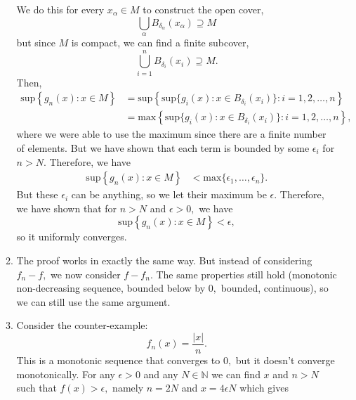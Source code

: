 \documentclass{article}
\numberwithin{equation}{section}
\begin{document}
\begin{enumerate}
\begin{enumerate}[label=(\alph*)]
        We do this for every $x_\alpha \in M$ to construct the open cover,
        \begin{equation}
            \bigcup_\alpha B_{\delta_{\alpha}}(x_\alpha) \supseteq M
        \end{equation}
        but since $M$ is compact, we can find a finite subcover,
        \begin{equation}
            \bigcup_{i=1}^n B_{\delta_i}(x_i) \supseteq M.
        \end{equation}
        Then,
        \begin{align}
            \text{sup}\left\{
                g_n(x):x\in M
            \right\} &=\text{sup}\left\{
                \text{sup}\{g_i(x):x\in B_{\delta_i}(x_i)\}:i=1,2,\dots,n
            \right\} \\ 
            &= \text{max}\left\{
                \text{sup}\{g_i(x):x\in B_{\delta_i}(x_i)\}:i=1,2,\dots,n
            \right\}, 
        \end{align}
        where we were able to use the maximum since there are a finite number of elements. But we have shown that each term is bounded by some $\epsilon_i$ for $n>N.$ Therefore, we have 
        \begin{align}
            \text{sup}\left\{
                g_n(x):x\in M
            \right\} &< \text{max}\{\epsilon_1,\dots,\epsilon_n\}.
        \end{align}
        But these $\epsilon_i$ can be anything, so we let their maximum be $\epsilon.$ Therefore, we have shown that for $n>N$ and $\epsilon >0,$ we have 
        \begin{equation}
            \text{sup}\left\{
                g_n(x):x\in M
            \right\} < \epsilon,
        \end{equation}
        so it uniformly converges.
        \item The proof works in exactly the same way. But instead of considering $f_n-f,$ we now consider $f-f_n.$ The same properties still hold (monotonic non-decreasing sequence, bounded below by $0,$ bounded, continuous), so we can still use the same argument.
        \item Consider the counter-example: 
        \begin{equation}
            f_n(x) = \frac{|x|}{n}.
        \end{equation}
        This is a monotonic sequence that converges to $0,$ but it doesn't converge monotonically. For any $\epsilon > 0$ and any $N\in \mathbb{N}$ we can find $x$ and $n>N$ such that $f(x) > \epsilon,$ namely $n=2N$ and $x=4\epsilon N$ which gives 

\end{enumerate}
\end{enumerate}
\end{document}
